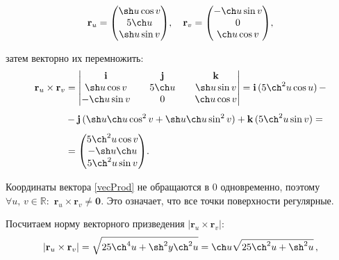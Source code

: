 \documentclass[12pt,a4paper]{article}
\newcommand{\boldVec}[1]{\mathbf #1}
\newcommand{\vectorProduct}[2]{\boldVec #1 \times \boldVec #2}
\begin{document}
    \[
        \boldVec r_u = 
            \begin{pmatrix}
                \sh u \cos v
                \\
                5\ch u
                \\
                \sh u \sin v
            \end{pmatrix}\! , \quad  
        \boldVec r_v = 
            \begin{pmatrix}
                -\ch u \sin v
                \\
                0
                \\
                \ch u \cos v
            \end{pmatrix}\! ,
    \]

    \pagebreak

    \noindent затем векторно их перемножить:
    \begin{equation}
        \label{vecProd}
        \begin{split}
            \vectorProduct{r _u}{r_v} & = 
            \begin{vmatrix}
                \boldVec i && \boldVec j && \boldVec k
                \\
                \sh u \cos v && 5\ch u && \sh u \sin v
                \\
                -\ch u \sin v && 0 && \ch u \cos v
            \end{vmatrix} = \boldVec i\,(5 \ch^2 u \cos u )\, - 
            \\[0.4em]
            & - \boldVec j\,(\sh u \ch u \cos^2 v + \sh u \ch u \sin^2 v) + \boldVec k\,(5 \ch^2 u \sin v) =
            \\[0.4em]
            & = \begin{pmatrix}
                5 \ch^2 u \cos v
                \\
                -\sh u \ch u
                \\
                5 \ch^2 u \sin v
            \end{pmatrix}\! .
        \end{split}
    \end{equation}

    Координаты вектора \eqref{vecProd} не обращаются в $ 0 $ одновременно, поэтому $ \forall u,\, v \in \mathbb{R}\colon $ $ \boldVec r_u \times \boldVec r_v \ne \boldVec{0}$. Это означает, что все точки поверхности регулярные.

    Посчитаем норму векторного призведения $ | \boldVec r_u \times \boldVec r_v | \colon$ 
    \[
        | \boldVec r_u \times \boldVec r_v | = \sqrt{25 \ch^4 u + \sh^2 y \ch^2 u} = \ch u \sqrt { 25 \ch^2 u + \sh^2 u }\, , 
    \]
\end{document}
